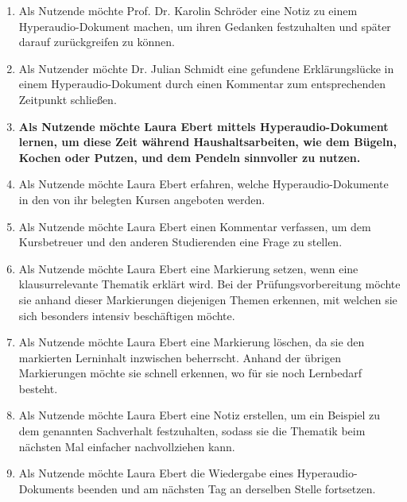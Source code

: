 \begin{enumerate}
\item Als Nutzende möchte Prof. Dr. Karolin Schröder eine Notiz zu einem Hyperaudio-Dokument machen, um ihren Gedanken festzuhalten und später darauf zurückgreifen zu können.

\item Als Nutzender möchte Dr. Julian Schmidt eine gefundene Erklärungslücke in einem Hyperaudio-Dokument durch einen Kommentar zum entsprechenden Zeitpunkt schließen.


\item \textbf{Als Nutzende möchte Laura Ebert mittels Hyperaudio-Dokument lernen, um diese Zeit während Haushaltsarbeiten, wie dem Bügeln, Kochen oder Putzen, und dem Pendeln sinnvoller zu nutzen.}

\item Als Nutzende möchte Laura Ebert erfahren, welche Hyperaudio-Dokumente in den von ihr belegten Kursen angeboten werden.

\item Als Nutzende möchte Laura Ebert einen Kommentar verfassen, um dem Kursbetreuer und den anderen Studierenden eine Frage zu stellen.

\item Als Nutzende möchte Laura Ebert eine Markierung setzen, wenn eine klausurrelevante Thematik erklärt wird. Bei der Prüfungsvorbereitung möchte sie anhand dieser Markierungen diejenigen Themen erkennen, mit welchen sie sich besonders intensiv beschäftigen möchte.

\item Als Nutzende möchte Laura Ebert eine Markierung löschen, da sie den markierten Lerninhalt inzwischen beherrscht. Anhand der übrigen Markierungen möchte sie schnell erkennen, wo für sie noch Lernbedarf besteht.

\item Als Nutzende möchte Laura Ebert eine Notiz erstellen, um ein Beispiel zu dem genannten Sachverhalt festzuhalten, sodass sie die Thematik beim nächsten Mal einfacher nachvollziehen kann.

\item Als Nutzende möchte Laura Ebert die Wiedergabe eines Hyperaudio-Dokuments beenden und am nächsten Tag an derselben Stelle fortsetzen.


\end{enumerate}
